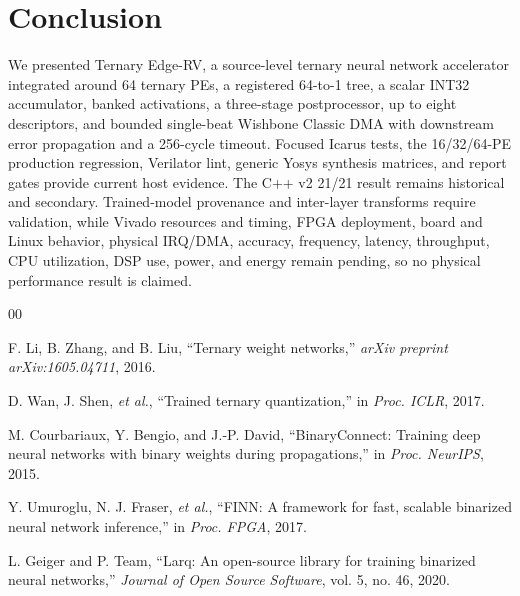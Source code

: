 \documentclass[10pt,conference]{IEEEtran}
\begin{document}
\section{Conclusion}
\label{sec:conclusion}

We presented Ternary Edge-RV, a source-level ternary neural network accelerator integrated around 64 ternary PEs, a registered 64-to-1 tree, a scalar INT32 accumulator, banked activations, a three-stage postprocessor, up to eight descriptors, and bounded single-beat Wishbone Classic DMA with downstream error propagation and a 256-cycle timeout. Focused Icarus tests, the 16/32/64-PE production regression, Verilator lint, generic Yosys synthesis matrices, and report gates provide current host evidence. The C++ v2 21/21 result remains historical and secondary. Trained-model provenance and inter-layer transforms require validation, while Vivado resources and timing, FPGA deployment, board and Linux behavior, physical IRQ/DMA, accuracy, frequency, latency, throughput, CPU utilization, DSP use, power, and energy remain pending, so no physical performance result is claimed.

\begin{thebibliography}{00}

 F. Li, B. Zhang, and B. Liu, ``Ternary weight networks,'' \textit{arXiv preprint arXiv:1605.04711}, 2016.

 D. Wan, J. Shen, \textit{et al.}, ``Trained ternary quantization,'' in \textit{Proc. ICLR}, 2017.

 M. Courbariaux, Y. Bengio, and J.-P. David, ``BinaryConnect: Training deep neural networks with binary weights during propagations,'' in \textit{Proc. NeurIPS}, 2015.

 Y. Umuroglu, N. J. Fraser, \textit{et al.}, ``FINN: A framework for fast, scalable binarized neural network inference,'' in \textit{Proc. FPGA}, 2017.

 L. Geiger and P. Team, ``Larq: An open-source library for training binarized neural networks,'' \textit{Journal of Open Source Software}, vol. 5, no. 46, 2020.

\end{thebibliography}
\end{document}
